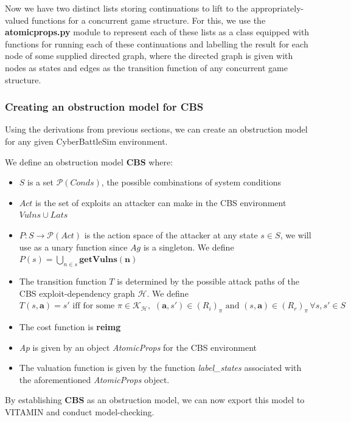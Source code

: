 Now we have two distinct lists storing continuations to lift to the appropriately-valued functions for a concurrent game structure. For this, we use the \textbf{atomicprops.py} module to represent each of these lists as a class equipped with functions for running each of these continuations and labelling the result for each node of some supplied directed graph, where the directed graph is given with nodes as states and edges as the transition function of any concurrent game structure.
\subsubsection{Creating an obstruction model for CBS}
Using the derivations from previous sections, we can create an obstruction model for any given CyberBattleSim environment.
\begin{construction}
We define an obstruction model $\mathbf{CBS}$ where:
\begin{itemize}
    \item $S$ is a set $\mathcal{P}(\textit{Conds})$, the possible combinations of system conditions
    \item $Act$ is the set of exploits an attacker can make in the CBS environment $Vulns \cup Lats$
    \item $P: S \rightarrow \mathcal{P}(Act)$ is the action space of the attacker at any state $s\in S$, we will use as a unary function since $Ag$ is a singleton. We define $P(s) = \bigcup_{n\in s } \mathbf{getVulns(n)}$
    \item The transition function $T$ is determined by the possible attack paths of the CBS exploit-dependency graph $\mathcal{H}$. We define  $T(s, \mathbf{a}) = s' \text{ iff for some } \pi \in \mathcal{K}_{\mathcal{H}}, \, \, (\mathbf{a}, s') \in (R_{i})_{\pi}\text{ and } (s, \mathbf{a}) \in (R_{r})_{\pi} \, \forall s, s' \in S $
    \item The cost function is \textbf{reimg}
    \item \textit{Ap} is given by an object \textit{AtomicProps} for the CBS environment
    \item The valuation function is given by the function \textit{label\_states} associated with the aforementioned \textit{AtomicProps} object.
\end{itemize}
\end{construction}

By establishing \textbf{CBS} as an obstruction model, we can now export this model to VITAMIN and conduct model-checking.

